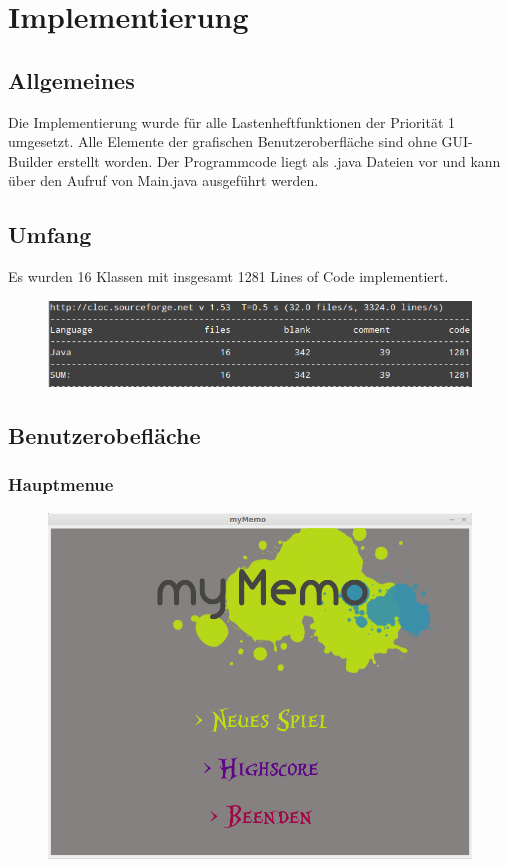\clearpage

\chapter{Implementierung}

\section{Allgemeines}
Die Implementierung wurde für alle Lastenheftfunktionen der Priorität 1 umgesetzt. Alle Elemente der grafischen Benutzeroberfläche sind ohne GUI-Builder erstellt worden. Der Programmcode liegt als .java Dateien vor und kann über den Aufruf von Main.java ausgeführt werden.

\section{Umfang}
Es wurden 16 Klassen mit insgesamt 1281 Lines of Code implementiert.

\begin{figure}[!h]
	\centering
    \includegraphics[width=\textwidth]{./cloc.png}
	\label{layout_gesamt}
\end{figure}


\clearpage
\section{Benutzerobefläche}

\subsection{Hauptmenue}
\begin{figure}[!h]
	\centering
    \includegraphics[width=\textwidth]{./guiHauptmenue.png}
	\label{}
\end{figure}
